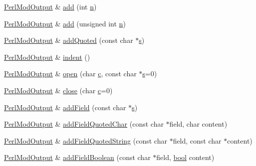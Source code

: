 \begin{DoxyCompactItemize}
\item 
\hyperlink{class_perl_mod_output}{Perl\+Mod\+Output} \& \hyperlink{class_perl_mod_output_a0517f1dc18d5d9c8c1d4e2d2aee24479}{add} (int \hyperlink{060__command__switch_8tcl_acdde3cd86eb2421ce8dbb2e85227d368}{n})
\item 
\hyperlink{class_perl_mod_output}{Perl\+Mod\+Output} \& \hyperlink{class_perl_mod_output_af4e7a0431dc492c404654d09edf519f3}{add} (unsigned int \hyperlink{060__command__switch_8tcl_acdde3cd86eb2421ce8dbb2e85227d368}{n})
\item 
\hyperlink{class_perl_mod_output}{Perl\+Mod\+Output} \& \hyperlink{class_perl_mod_output_ad17287468f089f08464b350ba2a140b8}{add\+Quoted} (const char $\ast$\hyperlink{060__command__switch_8tcl_a011c73f2dbb87635a3b4206c72355f6e}{s})
\item 
\hyperlink{class_perl_mod_output}{Perl\+Mod\+Output} \& \hyperlink{class_perl_mod_output_ac08110cde760efc8995f58e5a922ffff}{indent} ()
\item 
\hyperlink{class_perl_mod_output}{Perl\+Mod\+Output} \& \hyperlink{class_perl_mod_output_a1a2f0463cf38f334085541eb1b4211fa}{open} (char \hyperlink{060__command__switch_8tcl_ab14f56bc3bd7680490ece4ad7815465f}{c}, const char $\ast$\hyperlink{060__command__switch_8tcl_a011c73f2dbb87635a3b4206c72355f6e}{s}=0)
\item 
\hyperlink{class_perl_mod_output}{Perl\+Mod\+Output} \& \hyperlink{class_perl_mod_output_a70c627c62f8699e4b184515e1c18b2ee}{close} (char \hyperlink{060__command__switch_8tcl_ab14f56bc3bd7680490ece4ad7815465f}{c}=0)
\item 
\hyperlink{class_perl_mod_output}{Perl\+Mod\+Output} \& \hyperlink{class_perl_mod_output_a6dbf1c36ff3ce95fed4a2ff3c9743149}{add\+Field} (const char $\ast$\hyperlink{060__command__switch_8tcl_a011c73f2dbb87635a3b4206c72355f6e}{s})
\item 
\hyperlink{class_perl_mod_output}{Perl\+Mod\+Output} \& \hyperlink{class_perl_mod_output_a41c914573da8e0303a9b16ee74f5e3ed}{add\+Field\+Quoted\+Char} (const char $\ast$field, char content)
\item 
\hyperlink{class_perl_mod_output}{Perl\+Mod\+Output} \& \hyperlink{class_perl_mod_output_a4aa4d03f69c35b34fb6d67c82882de74}{add\+Field\+Quoted\+String} (const char $\ast$field, const char $\ast$content)
\item 
\hyperlink{class_perl_mod_output}{Perl\+Mod\+Output} \& \hyperlink{class_perl_mod_output_a1757cf0f9469290547d8b649801c1e72}{add\+Field\+Boolean} (const char $\ast$field, \hyperlink{qglobal_8h_a1062901a7428fdd9c7f180f5e01ea056}{bool} content)

\end{DoxyCompactItemize}
